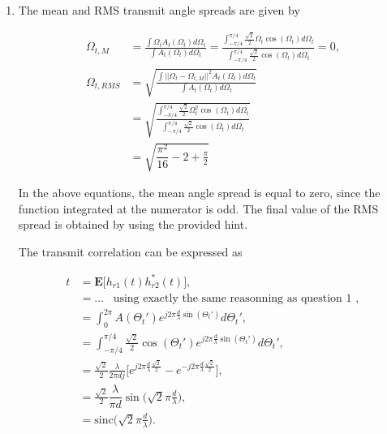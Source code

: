 \documentclass [a4paper, 11pt] {article}
\begin{document}
    \begin{solution}
        \begin{enumerate}
            \item The mean and RMS transmit angle spreads are given by

    \begin{align}
      \Omega_{t,M} &= \frac{\int\Omega_t A_t(\Omega_t) d\Omega_t}{\int A_t(\Omega_t) d\Omega_t}  = \frac{\int_{-\pi/4}^{\pi/4} \frac{\sqrt{2}}{2} \Omega_t \cos(\Omega_t) d\Omega_t}{\int_{-\pi/4}^{\pi/4} \frac{\sqrt{2}}{2} \cos(\Omega_t) d\Omega_t} = 0, \\
      \Omega_{t,RMS} &= \sqrt{\frac{\int \big| \big| \Omega_t - \Omega_{t,M} \big| \big|^2 A_t(\Omega_t) d\Omega_t}{\int A_t(\Omega_t) d\Omega_t}} \nonumber\\
      &= \sqrt{\frac{\int_{-\pi/4}^{\pi/4} \frac{\sqrt{2}}{2} \Omega_t^2 \cos(\Omega_t) d\Omega_t}{\int_{-\pi/4}^{\pi/4} \frac{\sqrt{2}}{2} \cos(\Omega_t) d\Omega_t}}\nonumber\\
      &= \sqrt{\dfrac{\pi^2}{16}-2+\frac{\pi}{2}}
    \end{align}

In the above equations, the mean angle spread is equal to zero, since the function integrated at the numerator is odd. The final value of the RMS spread is obtained by using the provided hint.

The transmit correlation can be expressed as

\begin{align}
        t &= \mathbf{E}\Big[h_{r1}(t)h_{r2}^*(t) \Big], \\
        &= \hdots \; \; \; \text{using exactly the same reasonning as question 1 },\\
        &= \int_{0}^{2\pi} A(\Theta_t') e^{j2\pi\frac{d}{\lambda}\sin(\Theta_t')}  d\Theta_t', \\
        &= \int_{-\pi/4}^{\pi/4} \frac{\sqrt{2}}{2}\cos(\Theta_t') e^{j2\pi\frac{d}{\lambda}\sin(\Theta_t')}  d\Theta_t', \\
        &= \frac{\sqrt{2}}{2} \frac{\lambda}{2\pi d j}\Big[e^{j2\pi\frac{d}{\lambda}\frac{\sqrt{2}}{2}} - e^{-j2\pi\frac{d}{\lambda}\frac{\sqrt{2}}{2}}\Big], \\
        &= \frac{\sqrt{2}}{2}\dfrac{\lambda}{\pi d}\sin\bigg( \sqrt{2} \pi \frac{d}{\lambda} \bigg),\\
        &= \text{sinc}\bigg( \sqrt{2} \pi \frac{d}{\lambda} \bigg).
    \end{align}
        \end{enumerate}
    \end{solution}
\end{document}
